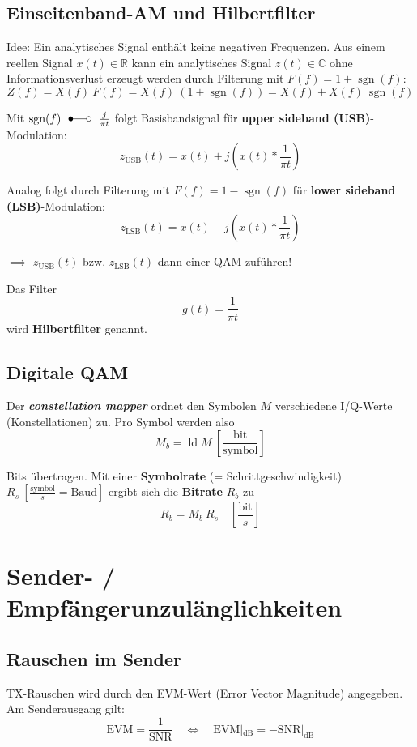 \documentclass[a4paper, 11pt]{article}
\DeclareMathOperator{\sgn}{sgn}
\DeclareMathOperator{\ld}{ld}
\begin{document}
\subsection*{Einseitenband-AM und Hilbertfilter}
Idee: Ein analytisches Signal enthält keine negativen Frequenzen. Aus einem reellen Signal $x(t) \in \mathbb R$ kann ein analytisches Signal $z(t) \in \mathbb C$ ohne Informationsverlust erzeugt werden durch Filterung mit $F(f) = 1 + \sgn(f)$:
\[
	Z(f) = X(f) ~ F(f) = X(f) ~ (1 + \sgn(f)) = X(f) + X(f) ~ \sgn(f)
\]

\raggedright
Mit $\sgn(f) ~~ \Laplace ~~ \frac{j}{\pi t}$ folgt Basisbandsignal für \textbf{upper sideband (USB)}-Modulation:
\[
	z_{\mathrm{USB}}(t) = x(t) + j \left(x(t) * \frac{1}{\pi t} \right)
\]

\raggedright
Analog folgt durch Filterung mit $F(f) = 1 - \sgn(f)$ für \textbf{lower sideband (LSB)}-Modulation:
\[
	z_{\mathrm{LSB}}(t) = x(t) - j \left(x(t) * \frac{1}{\pi t} \right)
\]

$\implies$ $z_{\mathrm{USB}}(t)$ bzw. $z_{\mathrm{LSB}}(t)$ dann einer QAM zuführen!

Das Filter
\[
	g(t) = \frac{1}{\pi t}
\]
wird \textbf{Hilbertfilter} genannt.

\subsection*{Digitale QAM}
Der \textit{\textbf{constellation mapper}} ordnet den Symbolen $M$ verschiedene I/Q-Werte (Konstellationen) zu. Pro Symbol werden also
\[
	M_b = \ld M ~ \left[ \frac{\mathrm{bit}}{\mathrm{symbol}} \right]
\]

Bits übertragen. Mit einer \textbf{Symbolrate} (= Schrittgeschwindigkeit) $R_s ~ \left[\frac{\mathrm{symbol}}{s} = \mathrm{Baud}\right]$ ergibt sich die \textbf{Bitrate} $R_b$ zu
\[
	R_b = M_b ~ R_s \quad \left[ \frac{\mathrm{bit}}{s} \right]
\]

\section*{Sender- / Empfängerunzulänglichkeiten}
\subsection*{Rauschen im Sender}
TX-Rauschen wird durch den EVM-Wert (Error Vector Magnitude) angegeben. Am Senderausgang gilt:
\[
	\mathrm{EVM} = \frac{1}{\mathrm{SNR}} \quad \Leftrightarrow \quad \mathrm{EVM}|_{\mathrm{dB}} = - \mathrm{SNR}|_{\mathrm{dB}}
\]
\end{document}
